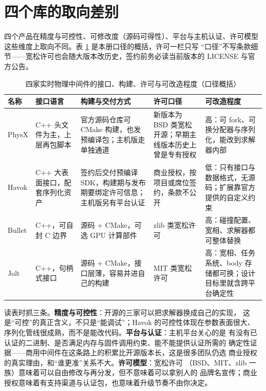 \documentclass[12pt,a4paper,fontset=fandol]{ctexbook}
\newcommand{\Lang}[1]{\textsf{#1}}
\newcommand{\CL}{\Lang{C}}
\newcommand{\CPP}{\Lang{C++}}
\begin{document}
\section{四个库的取向差别}
\label{sec:ch13-libraries}

四个产品在精度与可控性、可修改度（源码可得性）、平台与主机认证、许可模型
这些维度上取向不同。表 \ref{tab:ch13-libs} 是本册口径的概括，许可一栏只写
``口径''不写条款细节——宽松许可也会随大版本改历史，签约前务必读当前版本的
LICENSE 与官方公告。

\begin{table}[htbp]
\centering
\footnotesize
\caption{四家实时物理中间件的接口、构建、许可与可改造程度（口径概括）}
\label{tab:ch13-libs}
\begin{tabular}{>{\raggedright\arraybackslash}p{}
                >{\raggedright\arraybackslash}p{}
                >{\raggedright\arraybackslash}p{}
                >{\raggedright\arraybackslash}p{}
                >{\raggedright\arraybackslash}p{}}
\toprule
名称 & 接口语言 & 构建与交付方式 & 许可口径 & 可改造程度 \\
\midrule
PhysX & \CPP{} 头文件为主，上层再包脚本 & 官方源码仓库可 CMake 构建，也发预编译包；主机版走单独通道 & 新版本为 BSD 类宽松开源；早期主线版本历史上曾是专有授权 & 高：可 fork、可换分配器与序列化，能改到求解器内部 \\
Havok & \CPP{} 大表面接口，配套序列化资产 & 签约后交付预编译 SDK，构建期与发布期要绑定许可信息；主机版另有平台认证 & 商业授权，按项目或席位签约，条款不公开 & 低：只有接口与数据格式，无源码；扩展靠官方提供的自定义约束 \\
Bullet & \CPP{}，可自封 \CL{} 边界 & 源码 + CMake，可选 GPU 计算部件 & zlib 类宽松许可 & 高：碰撞配置、宽相、求解器都可整体替换 \\
Jolt & \CPP{}，句柄式接口 & 源码 + CMake，接口层薄，容易并进自己的构建 & MIT 类宽松许可 & 高：宽相、任务系统、body 存储都可换；设计目标里就含跨平台确定性 \\
\bottomrule
\end{tabular}
\end{table}

读表时抓三条。\textbf{精度与可控性}：开源的三家可以把求解器换成自己的实现，
这是``可控''的真正含义，不只是``能调试''；Havok 的可控性体现在参数表面很大、
序列化管线很成熟，而不是能改代码。\textbf{平台与认证}：主机平台关心的是
有没有已认证的二进制、是否满足内存与固件调用约束、能不能提供认证所需的
确定性证据——商用中间件在这条路上的积累比开源版本长，这是很多团队仍选
商业授权的真实理由，和``谁更准''关系不大。\textbf{许可模型}：宽松许可
（BSD、MIT、zlib 一族）意味着可以自由修改与再分发，但不意味着可以拿别人的
品牌名宣传；商业授权意味着有支持渠道与认证包，也意味着升级节奏不由你决定。
\end{document}
